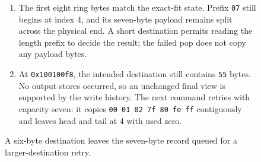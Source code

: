 \begin{figure}[htbp]
\begin{minipage}{\linewidth}
\begin{enumerate}
      \item The first eight ring bytes match the exact-fit state. Prefix \texttt{07} still begins at index 4, and its seven-byte payload remains split across the physical end. A short destination permits reading the length prefix to decide the result; the failed pop does not copy any payload bytes.
      \item At \texttt{0x100100f8}, the intended destination still contains \texttt{55} bytes. No output stores occurred, so an unchanged final view is supported by the write history. The next command retries with capacity seven: it copies \texttt{00 01 02 7f 80 fe ff} contiguously and leaves head and tail at 4 with used zero.
    \end{enumerate}
  \end{minipage}
  \caption{A six-byte destination leaves the seven-byte record queued for a larger-destination retry.}
  \label{capture:014-ring-buffer-logger-f03-retry}
  \label{ring-f03-retry}
\end{figure}
\par
